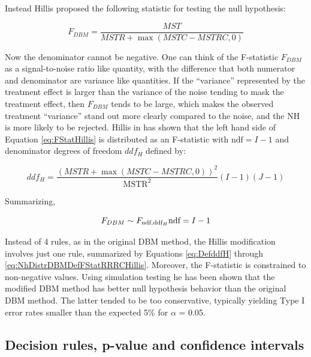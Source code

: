 \documentclass[
]{book}
\begin{document}
Instead Hillis \citep{RN1865} proposed the following statistic for testing the null hypothesis:

\begin{equation}
F_{DBM} = \frac{MST}{MSTR + \max \left (MSTC - MSTRC, 0  \right )}
\label{eq:FStatHillis}
\end{equation}

Now the denominator cannot be negative. One can think of the F-statistic \(F_{DBM}\) as a signal-to-noise ratio like quantity, with the difference that both numerator and denominator are variance like quantities. If the ``variance'' represented by the treatment effect is larger than the variance of the noise tending to mask the treatment effect, then \(F_{DBM}\) tends to be large, which makes the observed treatment ``variance'' stand out more clearly compared to the noise, and the NH is more likely to be rejected. Hillis in \citep{RN1772} has shown that the left hand side of Equation \eqref{eq:FStatHillis} is distributed as an F-statistic with \(\text{ndf} = I-1\) and denominator degrees of freedom \(ddf_H\) defined by:

\begin{equation}
ddf_H =\frac{\left ( MSTR + \max \left (MSTC - MSTRC,0  \right ) \right )^2}{\text{MSTR}^2}(I-1)(J-1)
\label{eq:DefddfH}
\end{equation}

Summarizing,

\begin{equation}
F_{DBM} \sim F_{\text{ndf},\text{ddf}_H} \\
\text{ndf}=I-1
\label{eq:NhDistrDBMDefFStatRRRCHillis}
\end{equation}

Instead of 4 rules, as in the original DBM method, the Hillis modification involves just one rule, summarized by Equations \eqref{eq:DefddfH} through \eqref{eq:NhDistrDBMDefFStatRRRCHillis}. Moreover, the F-statistic is constrained to non-negative values. Using simulation testing \citep{RN1866} he has been shown that the modified DBM method has better null hypothesis behavior than the original DBM method. The latter tended to be too conservative, typically yielding Type I error rates smaller than the expected 5\% for \(\alpha\) = 0.05.

\hypertarget{decision-rules-p-value-and-confidence-intervals}{%
\subsection{Decision rules, p-value and confidence intervals}\label{decision-rules-p-value-and-confidence-intervals}}
\end{document}
